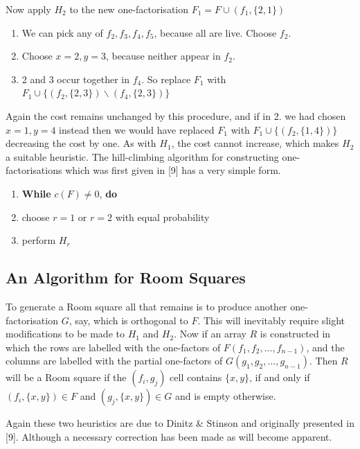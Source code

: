 \documentclass[
  12pt,
  a4paper]{book}
\begin{document}
Now apply \(H_2\) to the new one-factorisation \(F_1=F \cup (f_1,\{2,1\})\)

\begin{enumerate}
\def\labelenumi{\arabic{enumi}.}
\item
  We can pick any of \(f_2, f_3, f_4, f_5\), because all are live.
  Choose \(f_2\).
\item
  Choose \(x=2, y=3\), because neither appear in \(f_2\).
\item
  2 and 3 occur together in \(f_4\). So replace \(F_1\) with
  \(F_1 \cup \{(f_2,\{2,3\}) \backslash (f_4,\{2,3\})\}\)
\end{enumerate}

Again the cost remains unchanged by this procedure, and if in 2. we had
chosen \(x=1,y=4\) instead then we would have replaced \(F_1\) with
\(F_1 \cup \{(f_2,\{1,4\})\}\) decreasing the cost by one. As with \(H_1\),
the cost cannot increase, which makes \(H_2\) a suitable heuristic.
The hill-climbing algorithm for constructing one-factorisations which
was first given in {[}9{]} has a very simple form.

\begin{enumerate}
\def\labelenumi{\arabic{enumi}.}
\item
  \textbf{While} \(c(F) \neq 0\), \textbf{do}
\item
  choose \(r=1\) or \(r=2\) with equal probability
\item
  perform \(H_r\)
\end{enumerate}

\hypertarget{an-algorithm-for-room-squares}{%
\subsection{An Algorithm for Room Squares}\label{an-algorithm-for-room-squares}}

To generate a Room square all that remains is to produce another
one-factorisation \(G\), say, which is orthogonal to \(F\). This will
inevitably require slight modifications to be made to \(H_1\) and \(H_2\).
Now if an array \(R\) is constructed in which the rows are labelled with
the one-factors of \(F(f_1,f_2,...,f_{n-1})\), and the columns are
labelled with the partial one-factors of \(G(g_1,g_2,...,g_{n-1})\). Then
\(R\) will be a Room square if the \((f_i,g_j)\) cell contains \(\{x,y\}\), if
and only if \((f_i,\{x,y\}) \in F\) and \((g_j,\{x,y\}) \in G\) and is empty
otherwise.

Again these two heuristics are due to Dinitz \& Stinson and originally
presented in {[}9{]}. Although a necessary correction has been made as will
become apparent.
\end{document}
